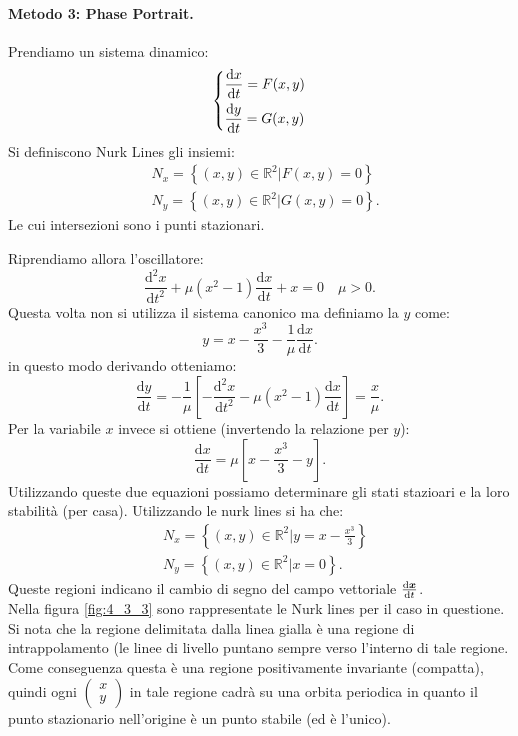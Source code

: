 \paragraph{Metodo 3: Phase Portrait.}%
\begin{defn}
    Prendiamo un sistema dinamico:
    \[
    \begin{dcases}
	\frac{\text{d} x}{\text{d} t} = F(x, y) \\
	\frac{\text{d} y}{\text{d} t} = G(x, y) 
    \end{dcases}
    \]
    Si definiscono Nurk Lines gli insiemi:
    \[\begin{aligned}
	& N_x = \left\{(x, y) \in \mathbb{R}^2 | F(x, y) = 0\right\}\\
	& N_y = \left\{(x, y) \in \mathbb{R}^2 | G(x, y) = 0\right\}
    .\end{aligned}\]
    Le cui intersezioni sono i punti stazionari.
\end{defn}
\noindent
Riprendiamo allora l'oscillatore:
\[
    \frac{\text{d} ^2x}{\text{d} t^2} + \mu\left(x^2-1\right)\frac{\text{d} x}{\text{d} t} + x = 0 \quad  \mu  > 0
.\] 
Questa volta non si utilizza il sistema canonico ma definiamo la $y$ come:
\[
    y = x-\frac{x^3}{3} - \frac{1}{\mu}\frac{\text{d} x}{\text{d} t} 
.\] 
in questo modo derivando otteniamo:
\[
    \frac{\text{d} y}{\text{d} t} = -\frac{1}{\mu}\left[-\frac{\text{d} ^2x}{\text{d} t^2} - \mu (x^2-1) \frac{\text{d} x}{\text{d} t} \right] = \frac{x}{\mu}
.\] 
Per la variabile $x$  invece si ottiene (invertendo la relazione per $y$):
\[
    \frac{\text{d} x}{\text{d} t} = \mu\left[x-\frac{x^3}{3}-y\right]
.\] 
Utilizzando queste due equazioni possiamo determinare gli stati stazioari e la loro stabilità (per casa). Utilizzando le nurk lines si ha che:
\[\begin{aligned}
    &N_x = \left\{(x, y) \in \mathbb{R}^2| y = x-\frac{x^3}{3}\right\}\\
    &N_y = \left\{(x, y) \in \mathbb{R}^2| x = 0\right\}
.\end{aligned}\]
Queste regioni indicano il cambio di segno del campo vettoriale $\frac{\text{d} \boldsymbol{x}}{\text{d} t}$.\\
Nella figura \ref{fig:4_3_3} sono rappresentate le Nurk lines per il caso in questione. Si nota che la regione delimitata dalla linea gialla è una regione di intrappolamento (le linee di livello puntano sempre verso l'interno di tale regione. Come conseguenza questa è una regione positivamente invariante (compatta), quindi ogni $\begin{pmatrix} x \\ y \end{pmatrix}$ in tale regione cadrà su una orbita periodica in quanto il punto stazionario nell'origine è un punto stabile (ed è l'unico).
